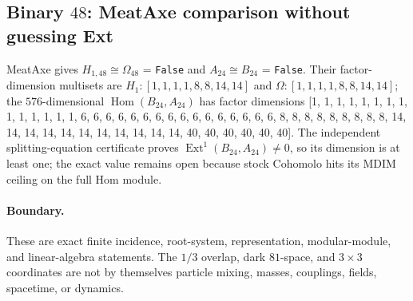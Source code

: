 \subsection{Binary $48$: MeatAxe comparison without guessing Ext}
MeatAxe gives $H_{1,48}\cong\Omega_{48}$ = \texttt{False} and
$A_{24}\cong B_{24}$ = \texttt{False}.  Their factor-dimension multisets are
$H_1:[1, 1, 1, 1, 8, 8, 14, 14]$ and $\Omega:[1, 1, 1, 1, 8, 8, 14, 14]$; the $576$-dimensional
$\operatorname{Hom}(B_{24},A_{24})$ has factor dimensions [1, 1, 1, 1, 1, 1, 1, 1, 1, 1, 1, 1, 1, 1, 6, 6, 6, 6, 6, 6, 6, 6, 6, 6, 6, 6, 6, 6, 6, 6, 8, 8, 8, 8, 8, 8, 8, 8, 8, 14, 14, 14, 14, 14, 14, 14, 14, 14, 14, 14, 40, 40, 40, 40, 40, 40].  The independent
splitting-equation certificate proves $\operatorname{Ext}^1(B_{24},A_{24})\ne0$,
so its dimension is at least one; the exact value remains open because stock
Cohomolo hits its MDIM ceiling on the full Hom module.

\paragraph{Boundary.}
These are exact finite incidence, root-system, representation, modular-module,
and linear-algebra statements.  The $1/3$ overlap, dark $81$-space, and
$3\times3$ coordinates are not by themselves particle mixing, masses,
couplings, fields, spacetime, or dynamics.
